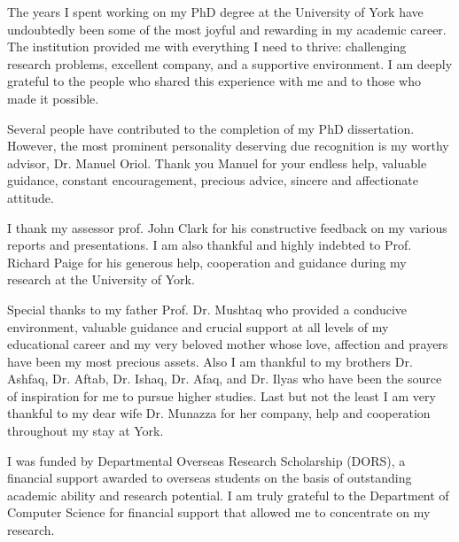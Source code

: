 \begin{acknowledgements}
The years I spent working on my PhD degree at the University of York have undoubtedly been some of the most joyful and rewarding in my academic career. The institution provided me with everything I need to thrive: challenging research problems, excellent company, and a supportive environment. I am deeply grateful to the people who shared this experience with me and to those who made it possible. 

Several people have contributed to the completion of my PhD dissertation. However, the most prominent personality deserving due recognition is my worthy advisor, Dr. Manuel Oriol. Thank you Manuel for your endless help, valuable guidance, constant encouragement, precious advice, sincere and affectionate attitude.

I thank my assessor prof. John Clark for his constructive feedback on my various reports and presentations. I am also thankful and highly indebted to Prof. Richard Paige for his generous help, cooperation and guidance during my research at the University of York.

Special thanks to my father Prof. Dr. Mushtaq who provided a conducive environment, valuable guidance and crucial support at all levels of my educational career and my very beloved mother whose love, affection and prayers have been my most precious assets. Also I am thankful to my brothers Dr. Ashfaq, Dr. Aftab, Dr. Ishaq, Dr. Afaq, and Dr. Ilyas who have been the source of inspiration for me to pursue higher studies. Last but not the least I am very thankful to my dear wife Dr. Munazza for her company, help and cooperation throughout my stay at York.

I was funded by Departmental Overseas Research Scholarship (DORS), a financial support awarded to overseas students on the basis of outstanding academic ability and research potential. I am truly grateful to the Department of Computer Science for financial support that allowed me to concentrate on my research.

\end{acknowledgements}